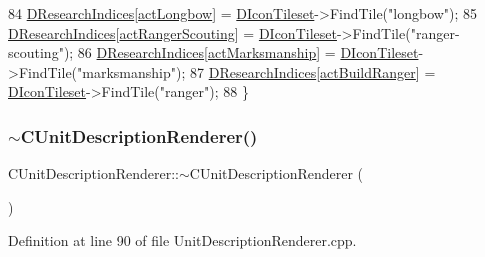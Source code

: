 \begin{DoxyCode}
84     \hyperlink{classCUnitDescriptionRenderer_aa34762a0be929d92ac9f0b151e3e3187}{DResearchIndices}[\hyperlink{GameDataTypes_8h_a35b98ce26aca678b03c6f9f76e4778cea626066b8caa034d801ef8cd601cd1cd7}{actLongbow}] = \hyperlink{classCUnitDescriptionRenderer_aadf76b5c018d76c3ff7bd8edc021d702}{DIconTileset}->FindTile(\textcolor{stringliteral}{"longbow"});
85     \hyperlink{classCUnitDescriptionRenderer_aa34762a0be929d92ac9f0b151e3e3187}{DResearchIndices}[\hyperlink{GameDataTypes_8h_a35b98ce26aca678b03c6f9f76e4778cea7c23f07dfc3362bc9b85d704b5750fd8}{actRangerScouting}] = 
      \hyperlink{classCUnitDescriptionRenderer_aadf76b5c018d76c3ff7bd8edc021d702}{DIconTileset}->FindTile(\textcolor{stringliteral}{"ranger-scouting"});
86     \hyperlink{classCUnitDescriptionRenderer_aa34762a0be929d92ac9f0b151e3e3187}{DResearchIndices}[\hyperlink{GameDataTypes_8h_a35b98ce26aca678b03c6f9f76e4778cea23634cb2bfdd2dcc6f6cd6433b36df36}{actMarksmanship}] = 
      \hyperlink{classCUnitDescriptionRenderer_aadf76b5c018d76c3ff7bd8edc021d702}{DIconTileset}->FindTile(\textcolor{stringliteral}{"marksmanship"});
87     \hyperlink{classCUnitDescriptionRenderer_aa34762a0be929d92ac9f0b151e3e3187}{DResearchIndices}[\hyperlink{GameDataTypes_8h_a35b98ce26aca678b03c6f9f76e4778cead539d31a3eb945161800e6342a05fb11}{actBuildRanger}] = 
      \hyperlink{classCUnitDescriptionRenderer_aadf76b5c018d76c3ff7bd8edc021d702}{DIconTileset}->FindTile(\textcolor{stringliteral}{"ranger"});
88 \}
\end{DoxyCode}
\hypertarget{classCUnitDescriptionRenderer_ae1e7ba8e6987507bd11bc59af961155b}{}\label{classCUnitDescriptionRenderer_ae1e7ba8e6987507bd11bc59af961155b} 
\subsubsection{\texorpdfstring{$\sim$\+C\+Unit\+Description\+Renderer()}{~CUnitDescriptionRenderer()}}
{\footnotesize\ttfamily C\+Unit\+Description\+Renderer\+::$\sim$\+C\+Unit\+Description\+Renderer (\begin{DoxyParamCaption}{ }\end{DoxyParamCaption})}



Definition at line 90 of file Unit\+Description\+Renderer.\+cpp.


